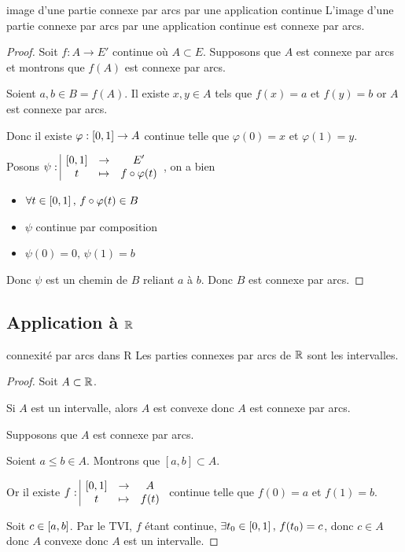 \begin{theoreme}{image d'une partie connexe par arcs par une application continue }{}
    L'image d'une partie connexe par arcs par une application continue est connexe par arcs.
\end{theoreme}

\begin{proof}
    Soit $f : A \to E'$ continue où $A \subset E$. Supposons que 
    $A$ est connexe par arcs et montrons que $f(A)$ est connexe par arcs. 

    Soient $a, b \in B = f(A)$. Il existe $x, y \in A$ tels que $f(x) = a$ et $f(y) = b$ or 
    $A$ est connexe par arcs. 

    Donc il existe $\varphi : \left[0, 1\right] \to A$ continue telle que $\varphi(0) = x$ et $\varphi(1) = y$.

    Posons $\psi: \space \begin{array}{|ccc} \displaystyle \left[0, 1\right] & \to & \displaystyle E' \\ \displaystyle t & \mapsto & \displaystyle  f \circ \varphi(t) \end{array}$, on a bien 

    \begin{itemize}
        \item $\forall t \in \left[0, 1\right], \, f \circ \varphi (t) \in B $ 
        \item $\psi$ continue par composition 
        \item $\psi(0) = 0, \, \psi(1) = b$
    \end{itemize}

    Donc $\psi $ est un chemin de $B$ reliant $a$ à $b$. Donc $B$ est connexe par arcs.
\end{proof}

\subsection{Application à \texorpdfstring{$\mathbb{R}$}{R}}

\begin{theoreme}{connexité par arcs dans R}{}
    Les parties connexes par arcs de $\mathbb{R}$ sont les intervalles.
\end{theoreme}

\begin{proof}
    Soit $A \subset \mathbb{R}$. 

    Si $A$ est un intervalle, alors $A$ est convexe donc $A$ est connexe par arcs. 

    Supposons que $A$ est connexe par arcs. 

    Soient $a \leqslant b \in A$. Montrons que $[a, b] \subset A$.

    Or il existe $f: \space \begin{array}{|ccc} \displaystyle \left[0, 1\right] & \to & \displaystyle A \\ \displaystyle t & \mapsto & \displaystyle f(t) \end{array}$ continue telle que $f(0) = a$ et $f(1) = b$.

    Soit $c \in \left[a, b\right]$. Par le TVI, $f$ étant continue, $\exists t_0 \in \left[0, 1\right], \, f(t_0) = c$, 
    donc $c \in A$ donc $A$ convexe donc $A$ est un intervalle.
\end{proof}

